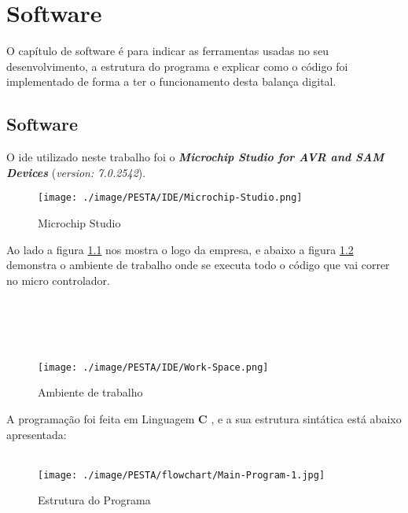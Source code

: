 \chapter{Software}
O capítulo de software é para indicar as ferramentas usadas no seu desenvolvimento, a estrutura do programa e explicar como o código foi implementado de forma a ter o funcionamento desta balança digital.
\section{Software}
O \ac{ide} utilizado neste trabalho foi o \textbf{\textit{{Microchip Studio for AVR\textsuperscript{\textregistered} and SAM Devices}}} (\textit{version: 7.0.2542}).
\\
\begin{minipage}[!b]{.55\linewidth}
	\begin{figure}[H]
		\captionsetup{justification=raggedright,singlelinecheck=false}
		\texttt{[image: ./image/PESTA/IDE/Microchip-Studio.png]}
		\caption{Microchip Studio}
		\label{Microchip-Studio}
	\end{figure}
\end{minipage}
\begin{minipage}[!b]{.45\linewidth}
	Ao lado a figura \ref{Microchip-Studio} nos mostra o logo da empresa, e abaixo a figura \ref{Work-Space} demonstra o ambiente de trabalho onde se executa todo o código que vai correr no micro controlador.
	\\
	\\
	\\
	\\
	\\
\end{minipage}
\begin{figure}[H]
	\centering
	\texttt{[image: ./image/PESTA/IDE/Work-Space.png]}
	\caption{Ambiente de trabalho}
	\label{Work-Space}
\end{figure}
A programação foi feita em Linguagem \textbf{C} \cite{book-11}, e a sua estrutura sintática está abaixo apresentada:
\\
\\
\begin{figure}[H]
	\centering
	\texttt{[image: ./image/PESTA/flowchart/Main-Program-1.jpg]}
	\caption{Estrutura do Programa}
	\label{Main_Program_1}
\end{figure}
